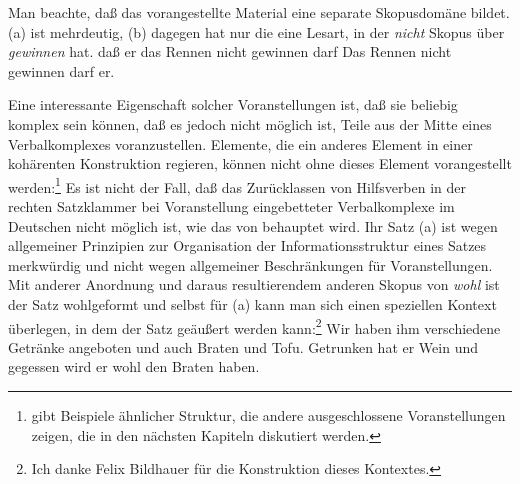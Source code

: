 Man beachte, daß das vorangestellte Material eine separate Skopusdomäne bildet.
(a) ist mehrdeutig, (b) dagegen hat nur die eine Lesart, in der \emph{nicht}
Skopus über \emph{gewinnen} hat.
\eal
\ex
daß er das Rennen nicht gewinnen darf
\ex
Das Rennen nicht gewinnen darf er.
\zl

\noindent
Eine interessante Eigenschaft solcher Voranstellungen ist, daß sie beliebig komplex
sein können, daß es jedoch nicht möglich ist, Teile aus der Mitte eines Verbalkomplexes
voranzustellen. Elemente, die ein anderes Element in einer kohärenten Konstruktion regieren,
können nicht ohne dieses Element vorangestellt werden:\footnote{
        \citet*[--721]{Haftka81a} gibt Beispiele ähnlicher Struktur,
        die andere ausgeschlossene Voranstellungen zeigen, die in den nächsten Kapiteln
        diskutiert werden.
}
\eal
{}
\label{ex-muessen-wird-er-ihr}
\zl
Es ist nicht der Fall, daß das Zurücklassen von Hilfsverben in der
rechten Satzklammer bei Voranstellung eingebetteter Verbalkomplexe im Deutschen
nicht möglich ist, wie das von \citet[]{SW94a}
behauptet wird. Ihr Satz (a) ist wegen allgemeiner Prinzipien zur Organisation
der Informationsstruktur eines Satzes merkwürdig und nicht wegen allgemeiner Beschränkungen
für Voranstellungen.
\eal
\label{bsp-gegessen-wird-er-wohl-den-braten-haben}
\zl
Mit anderer Anordnung und daraus resultierendem anderen Skopus von \emph{wohl} ist der Satz
wohlgeformt und selbst für (a) kann man sich einen speziellen Kontext überlegen, in dem der
Satz geäußert werden kann:\footnote{
  Ich danke Felix Bildhauer für die Konstruktion dieses Kontextes.
}
\ea
Wir haben ihm verschiedene Getränke angeboten und auch Braten und Tofu. Getrunken hat er Wein und
gegessen wird er wohl den Braten haben.
\z

